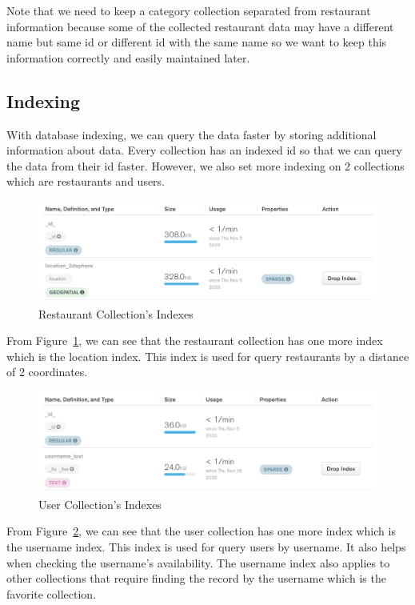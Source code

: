 \documentclass[12pt,oneside,openright,a4paper]{cpe-english-project}
\begin{document}
Note that we need to keep a category collection separated from restaurant information because some of the collected restaurant data may have a different name but same id or different id with the same name so we want to keep this information correctly and easily maintained later.


\subsection{Indexing}

With database indexing, we can query the data faster by storing additional information about data. Every collection has an indexed id so that we can query the data from their id faster. However, we also set more indexing on 2 collections which are restaurants and users.

\begin{figure}[H]\centering
\includegraphics[width=400pt]{./images/3db_RestaurantCollectionsIndexes.png}
\caption{Restaurant Collection’s Indexes}\label{fig:3db_RestaurantCollectionsIndexes}
\end{figure}

From Figure~\ref{fig:3db_RestaurantCollectionsIndexes}, we can see that the restaurant collection has one more index which is the location index. This index is used for query restaurants by a distance of 2 coordinates.
\begin{figure}[H]\centering
\includegraphics[width=400pt]{./images/3db_UserCollectionsIndexes.png}
\caption{User Collection’s Indexes}\label{fig:3db_UserCollectionsIndexes}
\end{figure}

From Figure~\ref{fig:3db_UserCollectionsIndexes}, we can see that the user collection has one more index which is the username index. This index is used for query users by username. It also helps when checking the username’s availability. The username index also applies to other collections that require finding  the record by the username which is the favorite collection.
\end{document}
